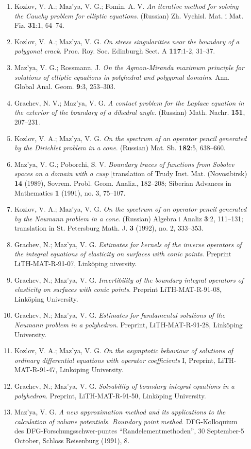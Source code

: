 \documentclass{article}
\begin{document}
\begin{enumerate}
{\bf 1991}
\item Kozlov, V. A.; Maz'ya, V. G.; Fomin, A. V. {\it An iterative
method
for solving the Cauchy problem for
elliptic equations}. (Russian) Zh. Vychisl. Mat. i Mat. Fiz. {\bf
31}:1,
64--74.
\item Kozlov, V. A.; Maz'ya, V. G. {\it On stress singularities near
the
boundary of a polygonal crack}.
Proc. Roy. Soc. Edinburgh Sect. A {\bf 117}:1-2, 31--37.
\item Maz'ya, V. G.; Rossmann, J. {\it On the Agmon-Miranda maximum
principle for solutions of
elliptic equations in polyhedral and polygonal domains}. Ann. Global
Anal.
Geom. {\bf 9}:3, 253--303.
\item Grachev, N. V.; Maz'ya, V. G. {\it A contact problem for the
Laplace
equation in the exterior of the boundary
of a dihedral angle}. (Russian) Math. Nachr. {\bf 151}, 207--231.
\item Kozlov, V. A.; Maz'ya, V. G. {\it On the spectrum of an operator
pencil generated by the Dirichlet problem
in a cone}. (Russian) Mat. Sb. {\bf 182}:5, 638--660.
\item Maz'ya, V. G.; Poborchi, S. V. {\it Boundary traces of functions
from
Sobolev spaces on a domain with a cusp}
[translation of Trudy Inst. Mat. (Novosibirsk) {\bf 14} (1989),
Sovrem.
Probl. Geom. Analiz., 182--208; Siberian
Advances in Mathematics {\bf 1} (1991), no. 3, 75--107.
\item Kozlov, V. A.; Maz'ya, V. G. {\it On the spectrum of an operator
pencil generated by the Neumann
problem in a cone}. (Russian) Algebra i Analiz {\bf 3}:2, 111--131;
translation in St. Petersburg Math. J. {\bf 3} (1992), no.
2, 333--353.
\item Grachev, N.; Maz'ya, V. G. {\it Estimates for kernels of the
inverse
operators of the integral equations of elasticity on
surfaces with conic points}. Preprint LiTH-MAT-R-91-07, Link\"oping
niversity.
\item Grachev, N.; Maz'ya, V. G. {\it Invertibility of the boundary
integral operators of elasticity on surfaces with conic points}.
Preprint LiTH-MAT-R-91-08, Link\"oping University.
\item Grachev, N.; Maz'ya, V. G. {\it Estimates for fundamental
solutions
of the Neumann problem in a polyhedron}. Preprint,
LiTH-MAT-R-91-28, Link\"oping University.
\item Kozlov, V. A.; Maz'ya, V. G. {\it On the asymptotic behaviour of
solutions of ordinary differential equations with operator
coefficients} I, Preprint, LiTH-MAT-R-91-47, Link\"oping University.
\item Grachev, N.; Maz'ya, V. G. {\it Solvability of boundary integral
equations in a polyhedron}. Preprint, LiTH-MAT-R-91-50,
Link\"oping University.
\item Maz'ya, V. G. {\it A new approximation method and its
applications to
the calculation of volume potentials. Boundary point
method}. DFG-Kolloquium des DFG-Forschungsschwer-puntes
``Randelementmethoden'', 30 September-5 October, Schloss Reisenburg
(1991),
8.\hfill\break


\end{enumerate}
\end{document}
